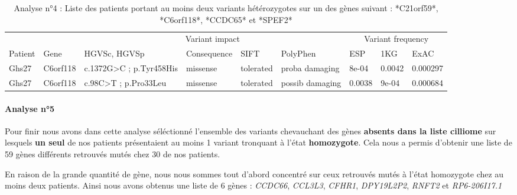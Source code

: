 \documentclass[12pt,twoside]{reedthesis}
\theoremstyle{definition}
\theoremstyle{definition}
\theoremstyle{remark}
\begin{document}
  \begin{landscape}
  \begin{longtable}[t]{lllllllll}
  \caption{\label{tab:tabgrp3low}Analyse n°4 : Liste des patients portant au moins deux variants hétérozygotes sur un des gènes suivant : *C21orf59*, *C6orf118*, *CCDC65*  et  *SPEF2*}\\
  \toprule
  \multicolumn{1}{c}{ } & \multicolumn{1}{c}{ } & \multicolumn{4}{c}{Variant impact} & \multicolumn{3}{c}{Variant frequency} \\
  \cmidrule(l{2pt}r{2pt}){3-6} \cmidrule(l{2pt}r{2pt}){7-9}
  Patient & Gene & HGVSc, HGVSp & Consequence & SIFT & PolyPhen & ESP & 1KG & ExAC\\
  \midrule
  Ghs27 & C6orf118 & c.1372G>C ; p.Tyr458His & missense & tolerated & proba damaging & 8e-04 & 0.0042 & 0.000297\\
  Ghs27 & C6orf118 & c.98C>T ; p.Pro33Leu & missense & tolerated & possib damaging & 0.0038 & 9e-04 & 0.000684\\
  \bottomrule
  \end{longtable}
  \end{landscape}
  
  \newpage
  
  \paragraph{Analyse n°5}\label{analyse-n5}
  
  Pour finir nous avons dans cette analyse séléctionné l'ensemble des
  variants chevauchant des gènes \textbf{absents dans la liste cilliome}
  sur lesquels \textbf{un seul} de nos patients présentaient au moins 1
  variant tronquant à l'état \textbf{homozygote}. Cela nous a permis
  d'obtenir une liste de 59 gènes différents retrouvés mutés chez 30 de
  nos patients.
  
  En raison de la grande quantité de gène, nous nous sommes tout d'abord
  concentré sur ceux retrouvés mutés à l'état homozygote chez au moins
  deux patients. Ainsi nous avons obtenus une liste de 6 gènes :
  \emph{CCDC66}, \emph{CCL3L3}, \emph{CFHR1}, \emph{DPY19L2P2},
  \emph{RNFT2} et \emph{RP6-206I17.1}
  
\end{document}
